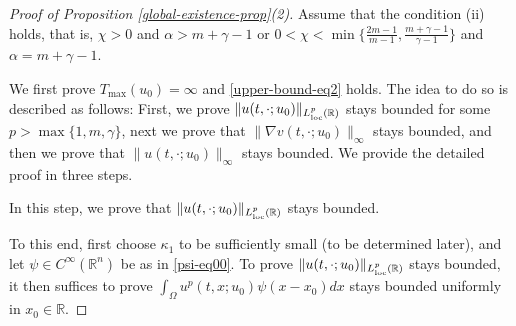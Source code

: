 \documentclass[11pt]{article} %
\theoremstyle{remark}
\theoremstyle{remark}
\numberwithin{equation}{section}
\numberwithin{figure}{section}
\numberwithin{table}{section}
\def\R{\mathbb R}
\newcommand\RR{\ensuremath{\mathbb{R}}}
\begin{document}
\begin{proof} [Proof of Proposition \ref{global-existence-prop}(2)]
Assume that the condition (ii) holds, that is, 
$\chi>0$ and $\alpha>m+\gamma-1$ or  $0<\chi<\min\{ \frac{2m-1}{m-1}, \frac{m+\gamma -1}{\gamma-1}\}$ and $\alpha=m+\gamma-1$.

\smallskip

We first prove $T_{\max}(u_0)=\infty$ and \eqref{upper-bound-eq2} holds.
The idea to do so  is described as follows:
 First, we  prove $\|u(t,\cdot;u_0)\|_{L_{\rm loc}^p(\RR)}$ stays bounded for some $p>\max\{1,m,\gamma\}$, next we  prove that  $ \|\nabla v(t,\cdot;u_0)\|_\infty$ stays bounded, and then  we prove that $\|u(t,\cdot;u_0)\|_\infty$ stays bounded. We provide the detailed proof in three steps.


\smallskip

 In this step, we prove  that $\|u(t,\cdot;u_0)\|_{L_{\rm loc}^p(\RR)}$ stays bounded. 

\smallskip

To this end,  first choose $\kappa_1$ to be sufficiently small (to be determined later),  and let
     $\psi\in C^\infty(\R^n)$  be as in \eqref{psi-eq00}.
 To prove $\|u(t,\cdot;u_0)\|_{L_{\rm loc}^p(\RR)}$ stays bounded, it then suffices to prove $\int_\Omega u^p(t,x;u_0)\psi(x-x_0)dx$ stays bounded uniformly in $x_0\in\RR$.


\end{proof}
\end{document}
